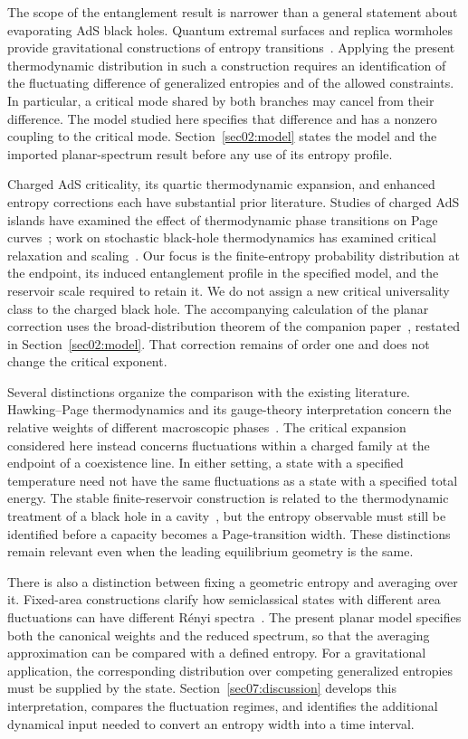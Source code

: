 \documentclass[11pt,letterpaper]{article}
\theoremstyle{plain}
\theoremstyle{definition}
\theoremstyle{remark}
\begin{document}
The scope of the entanglement result is narrower than a general statement about evaporating AdS black holes. Quantum extremal surfaces and replica wormholes provide gravitational constructions of entropy transitions~\cite{engelhardtwall2015,penington2020,almheiri2020,pssy2022}. Applying the present thermodynamic distribution in such a construction requires an identification of the fluctuating difference of generalized entropies and of the allowed constraints. In particular, a critical mode shared by both branches may cancel from their difference. The model studied here specifies that difference and has a nonzero coupling to the critical mode. Section~\ref{sec02:model} states the model and the imported planar-spectrum result before any use of its entropy profile.

Charged AdS criticality, its quartic thermodynamic expansion, and enhanced entropy corrections each have substantial prior literature. Studies of charged AdS islands have examined the effect of thermodynamic phase transitions on Page curves~\cite{lin2024}; work on stochastic black-hole thermodynamics has examined critical relaxation and scaling~\cite{awal2026}. Our focus is the finite-entropy probability distribution at the endpoint, its induced entanglement profile in the specified model, and the reservoir scale required to retain it. We do not assign a new critical universality class to the charged black hole. The accompanying calculation of the planar correction uses the broad-distribution theorem of the companion paper~\cite{wuebben2026}, restated in Section~\ref{sec02:model}. That correction remains of order one and does not change the critical exponent.

Several distinctions organize the comparison with the existing literature. Hawking--Page thermodynamics and its gauge-theory interpretation concern the relative weights of different macroscopic phases~\cite{hawkingpage1983,witten1998}. The critical expansion considered here instead concerns fluctuations within a charged family at the endpoint of a coexistence line. In either setting, a state with a specified temperature need not have the same fluctuations as a state with a specified total energy. The stable finite-reservoir construction is related to the thermodynamic treatment of a black hole in a cavity~\cite{york1986}, but the entropy observable must still be identified before a capacity becomes a Page-transition width. These distinctions remain relevant even when the leading equilibrium geometry is the same.

There is also a distinction between fixing a geometric entropy and averaging over it. Fixed-area constructions clarify how semiclassical states with different area fluctuations can have different R\'enyi spectra~\cite{dong2019,akers2019}. The present planar model specifies both the canonical weights and the reduced spectrum, so that the averaging approximation can be compared with a defined entropy. For a gravitational application, the corresponding distribution over competing generalized entropies must be supplied by the state. Section~\ref{sec07:discussion} develops this interpretation, compares the fluctuation regimes, and identifies the additional dynamical input needed to convert an entropy width into a time interval.
\end{document}
